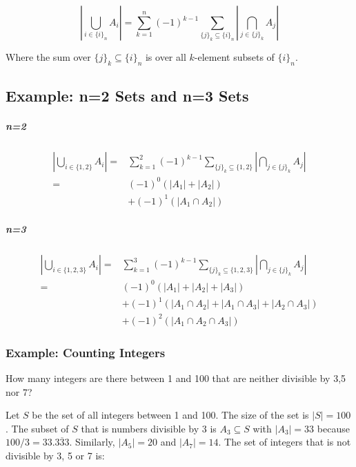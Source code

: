 \begin{equation}
\left|\bigcup_{i\in\{i\}_n} A_i\right| = \sum^n_{k=1} (-1)^{k-1} \sum_{\{j\}_k \subseteq \{i\}_n} \left|\bigcap_{j\in\{j\}_k} A_j\right|
\end{equation}


Where the sum over $\{j\}_k \subseteq \{i\}_n$ is over all $k$-element subsets of $\{i\}_n$.

\subsection{Example: n=2 Sets and n=3 Sets}

\subparagraph{n=2}
\begin{equation}
\begin{array}{rl}
\left|\bigcup_{i\in\{1,2\}}A_i\right| =&  \sum^2_{k=1} (-1)^{k-1} \sum_{\{j\}_k \subseteq \{1,2\}} \left|\bigcap_{j\in\{j\}_k} A_j\right|\\
=&(-1)^{0}\left(|A_1| + |A_2|\right) \\
&+ (-1)^{1}\left(|A_1 \cap A_2| \right)
\end{array}
\end{equation}


\subparagraph{n=3}
\begin{equation}
\begin{array}{rl}
\left|\bigcup_{i\in\{1,2,3\}}A_i\right| =&  \sum^3_{k=1} (-1)^{k-1} \sum_{\{j\}_k \subseteq \{1,2,3\}} \left|\bigcap_{j\in\{j\}_k} A_j\right|\\
=&(-1)^{0}\left(|A_1| + |A_2| + |A_3|\right) \\
&+ (-1)^{1}\left(|A_1 \cap A_2|  + |A_1 \cap A_3| + |A_2 \cap A_3|  \right) \\ 
&+ (-1)^{2}\left(|A_1 \cap A_2 \cap A_3|   \right)
\end{array}
\end{equation}

\subsubsection{Example: Counting Integers}

How many integers are there between 1 and 100 that are neither divisible by 3,5 nor 7?

Let $S$ be the set of all integers between 1 and 100. The size of the set is $|S| = 100$. The subset of $S$ that is numbers divisible by 3 is $A_3 \subseteq S$ with $|A_3| = 33$ because $100/3 = 33.\overline{333}$. Similarly, $|A_5| = 20$ and $|A_7| = 14$.  The set of integers that is not divisible by 3, 5 or 7 is:

